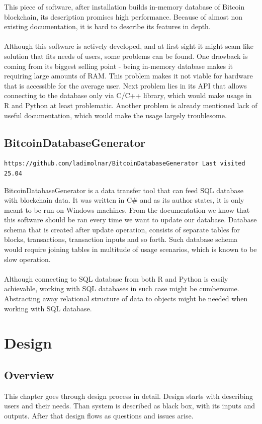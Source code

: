 \documentclass[12pt, en, eng, oneside]{mgr}
\begin{document}
This piece of software, after installation builds in-memory database of Bitcoin blockchain, its description promises high performance. Because of almost non existing documentation, it is hard to describe its features in depth.
\\
\\
Although this software is actively developed, and at first sight it might seam like solution that fits needs of users, some problems can be found. One drawback is coming from its biggest selling point - being in-memory database makes it requiring large amounts of RAM. This problem makes it not viable for hardware that is accessible for the average user. Next problem lies in its API that allows connecting to the database only via C/C++ library, which would make usage in R and Python at least problematic. Another problem is already mentioned lack of useful documentation, which would make the usage largely troublesome.

\section{BitcoinDatabaseGenerator}

\begin{verbatim}
https://github.com/ladimolnar/BitcoinDatabaseGenerator Last visited 25.04
\end{verbatim}

BitcoinDatabaseGenerator is a data transfer tool that can feed SQL database with blockchain data. It was written in C\# and as its author states, it is only meant to be run on Windows machines. From the documentation we know that this software should be ran every time we want to update our database. Database schema that is created after update operation, consists of separate tables for blocks, transactions, transaction inputs and so forth. Such database schema would require joining tables in multitude of usage scenarios, which is known to be slow operation.
\\
\\
Although connecting to SQL database from both R and Python is easily achievable, working with SQL databases in such case might be cumbersome. Abstracting away relational structure of data to objects might be needed when working with SQL database. 


\chapter{Design}

\section{Overview}
This chapter goes through design process in detail. Design starts with describing users and their needs. Than system is described as black box, with its inputs and outputs. After that design flows as questions and issues arise. 
\end{document}
